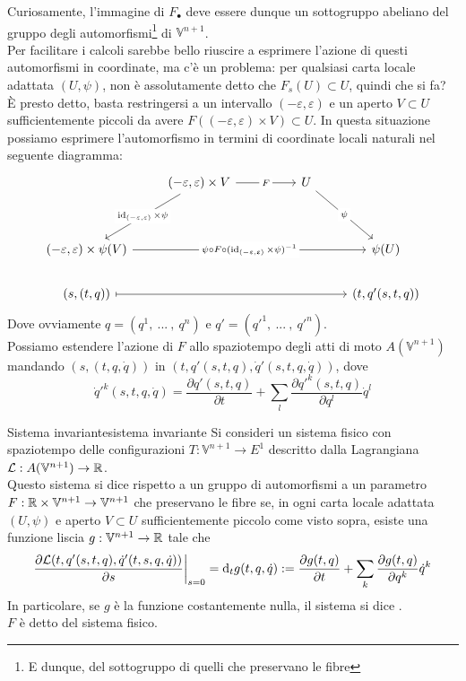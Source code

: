 \documentclass[openany]{book}
\renewcommand\V{\mathbb{V}}
\begin{document}
Curiosamente, l'immagine di $F_\bullet$ deve essere dunque un sottogruppo abeliano del gruppo degli automorfismi\footnote{E dunque, del sottogruppo di quelli che preservano le fibre} di $\V^{n+1}$.\\
Per facilitare i calcoli sarebbe bello riuscire a esprimere l'azione di questi automorfismi in coordinate, ma c'è un problema: per qualsiasi carta locale adattata $(U,\psi)$, non è assolutamente detto che $F_s(U) \subset U$, quindi che si fa?\\
È presto detto, basta restringersi a un intervallo $(-\varepsilon, \varepsilon)$ e un aperto $V\subset U$ sufficientemente piccoli da avere $F((-\varepsilon, \varepsilon)\times V)\subset U$. In questa situazione possiamo esprimere l'automorfismo in termini di coordinate locali naturali nel seguente diagramma:
\[\begin{tikzcd}
	& {(-\varepsilon,\varepsilon)\times V} && U & \\
	\\
	{(-\varepsilon,\varepsilon)\times \psi(V)} &&&& {\psi(U)} \\
	{(s,(t,q))} &&&& {(t,q'(s,t,q))}
	\arrow["F"{description}, from=1-2, to=1-4]
	\arrow["{\id_{(-\varepsilon, \varepsilon)}\times \psi}"{description}, from=1-2, to=3-1]
	\arrow["\psi"{description}, from=1-4, to=3-5]
	\arrow["{\psi\circ F\circ (\id_{(-\varepsilon, \varepsilon)}\times \psi)^{-1}}"{description}, from=3-1, to=3-5]
	\arrow[maps to, from=4-1, to=4-5]
\end{tikzcd}\]
Dove ovviamente $q = (q^1,\ ...\ ,\ q^n)$ e $q' = (q'^1,\ ...\ ,\ q'^n)$.\\
Possiamo estendere l'azione di $F$ allo spaziotempo degli atti di moto $A(\V^{n+1})$ mandando $(s,(t,q,\dot q))$ in $(t,q'(s,t,q),\dot q'(s,t,q,\dot q))$, dove 
\[ \dot q'^k (s,t,q,\dot q) = \frac{\partial q'(s,t,q)}{\partial t} + \sum_l \frac{\partial q'^k(s,t,q)}{\partial q^l} \dot q^l \]

\begin{definition}{Sistema invariante}{sistema invariante}
    Si consideri un sistema fisico con spaziotempo delle configurazioni $T:\V^{n+1}\to E^1$ descritto dalla Lagrangiana $\L:A(\V^{n+1})\to\R$.\\
    Questo sistema si dice  rispetto a un gruppo di automorfismi a un parametro $F:\R\times\V^{n+1}\to\V^{n+1}$ che preservano le fibre se, in ogni carta locale adattata $(U,\psi)$ e aperto $V\subset U$ sufficientemente piccolo come visto sopra, esiste una funzione liscia $g: \V^{n+1}\to\R$ tale che
    \[ \frac{\partial \mathcal{L}(t, q'(s,t,q), \dot q'(t,s,q,\dot q))}{\partial s}\bigg|_{s=0} = \text{d}_t g(t,q,\dot q) := \frac{\partial g(t,q)}{\partial t} + \sum_k \frac{\partial g(t,q)}{\partial q^k}\dot q^k \]
    In particolare, se $g$ è la funzione costantemente nulla, il sistema si dice .\\
    $F$ è detto  del sistema fisico.
\end{definition}
\end{document}
